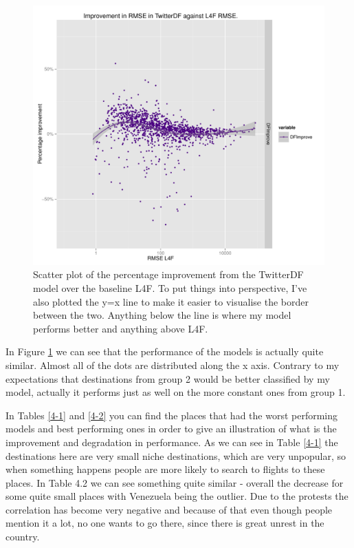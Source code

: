 \documentclass[minf,twoside,singlespacing,parskip,frontabs,notimes,11pt]{infthesis}
\begin{document}
\begin{figure}[]
\begin{center}
\includegraphics[scale=0.7]{RMSE}
\end{center}
\caption{Scatter plot of the percentage improvement from the TwitterDF model over the baseline L4F. To put things into perspective, I've also plotted the y=x line to make it easier to visualise the border between the two. Anything below the line is where my model performs better and anything above L4F.  }
\label{rmse-scatter}
\end{figure}


In Figure \ref{rmse-scatter} we can see that the performance of the models is actually quite similar. Almost all of the dots are distributed along the x axis. Contrary to my expectations that destinations from group 2 would be better classified by my model, actually it performs just as well on the more constant ones from group 1. 

In Tables \ref{4-1} and \ref{4-2} you can find the places that had the worst performing models and best performing ones in order to give an illustration of what is the improvement and degradation in performance. As we can see in Table \ref{4-1} the destinations here are very small niche destinations, which are very unpopular, so when something happens people are more likely to search to flights to these places. In Table 4.2 we can see something quite similar - overall the decrease for some quite small places with Venezuela being the outlier. Due to the protests the correlation has become very negative and because of that even though people mention it a lot, no one wants to go there, since there is great unrest in the country. 
\end{document}
